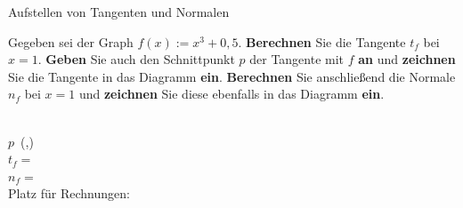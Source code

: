 \documentclass[
    ngerman,
    color=1b,
    load_common,
    leqno,
    boxarc,
    solution=true,
]{rubos-tuda-template}
\begin{document}
\begin{task}[points=5]{Aufstellen von Tangenten und Normalen}
    \def\coordinatesystemradius{4}
    \begin{minipage}[t]{.5\textwidth}
        \mbox{}\vspace{-2em}\begin{grayInfoBox}
            Gegeben sei der Graph $f(x):=x^3+0,5$. 
            \textbf{Berechnen} Sie die Tangente $t_f$ bei $x=1$. 
            \textbf{Geben} Sie auch den Schnittpunkt $p$ der Tangente mit $f$ \textbf{an} und \textbf{zeichnen} Sie die Tangente in das Diagramm \textbf{ein}.
            \textbf{Berechnen} Sie anschließend die Normale $n_f$ bei $x=1$ und \textbf{zeichnen} Sie diese ebenfalls in das Diagramm \textbf{ein}.
        \end{grayInfoBox}
        \mbox{}\\[2em]
        $p$~(\qquad,\qquad)\\[2em]
        $t_f=$~
        \dotfill\\[2em]
        $n_f=$~
        \dotfill\\[1em]
        Platz für Rechnungen:
    \end{minipage}

\end{task}
\end{document}
